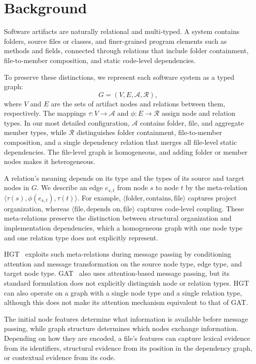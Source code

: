 \section{Background \label{sec:background}}

Software artifacts are naturally relational and multi-typed. A system contains folders, source files or classes, and finer-grained program elements such as methods and fields, connected through relations that include folder containment, file-to-member composition, and static code-level dependencies.

To preserve these distinctions, we represent each software system as a typed graph:
$$G=(V, E,\mathcal{A},\mathcal{R}),$$
where $V$ and $E$ are the sets of artifact nodes and relations between them, respectively. The mappings $\tau: V \rightarrow \mathcal{A}$ and $\phi: E \rightarrow \mathcal{R}$ assign node and relation types. In our most detailed configuration, $\mathcal{A}$ contains folder, file, and aggregate member types, while $\mathcal{R}$ distinguishes folder containment, file-to-member composition, and a single dependency relation that merges all file-level static dependencies. The file-level graph is homogeneous, and adding folder or member nodes makes it heterogeneous.

A relation's meaning depends on its type and the types of its source and target nodes in $G$. We describe an edge $e_{s,t}$ from node $s$ to node $t$ by the meta-relation $\langle \tau(s), \phi(e_{s,t}), \tau(t) \rangle$. For example, $\langle \text{folder}, \text{contains}, \text{file} \rangle$ captures project organization, whereas $\langle \text{file}, \text{depends on}, \text{file} \rangle$ captures code-level coupling. These meta-relations preserve the distinction between structural organization and implementation dependencies, which a homogeneous graph with one node type and one relation type does not explicitly represent.

HGT~\cite{hgt} exploits such meta-relations during message passing by conditioning attention and message transformation on the source node type, edge type, and target node type. GAT~\cite{gat} also uses attention-based message passing, but its standard formulation does not explicitly distinguish node or relation types. HGT can also operate on a graph with a single node type and a single relation type, although this does not make its attention mechanism equivalent to that of GAT.

The initial node features determine what information is available before message passing, while graph structure determines which nodes exchange information. Depending on how they are encoded, a file's features can capture lexical evidence from its identifiers, structural evidence from its position in the dependency graph, or contextual evidence from its code.

